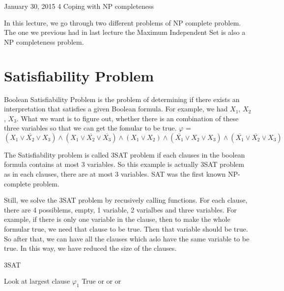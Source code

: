 \documentclass[usletter]{article}
\begin{document}
           {January 30, 2015}                          %
           {4}                                       %
           {Coping with NP completeness}  %

\noindent
In this lecture, we go through two different problems of NP complete problem. The one we previous had in last lecture the Maximum Independent Set is also a NP completeness problem.

\section{Satisfiability Problem}
Boolean Satisfiability Problem is the problem of determining if there exists an interpretation that satisfies a given Boolean formula.  For example,  we had ${X_{1}}$, ${X_{2}}$, ${X_{3}}$. What we want is to figure out, whether there is an combination of these three variables so that we can get the fomular to be true. 
$\varphi$ = $(X_{1}\vee \overline{X_{2}}\vee X_{3}) \wedge (X_{1}\vee \overline{X_{2}}\vee \overline{X_{3}}) \wedge(X_{1}\vee {X_{2}}) \wedge(\overline{X_{1}}\vee X_{2} \vee X_{3}) \wedge (\overline{X_{1}}\vee \overline{X_{2}}\vee X_{3})$

The Satisfiability problem is called 3SAT problem if each clauses in the boolean formula contains at most 3 variables. So this example is actually 3SAT problem as in each clauses, there are at most 3 variables. SAT was the first known NP-complete problem.

Still, we solve the 3SAT problem by recusively calling functions. For each clause, there are 4 possiblems, empty, 1 variable, 2 varialbes and three variables. For example, if there is only one variable in the clause, then to make the whole formular true, we need that clause to be true. Then that variable should be true. So after that, we can have all the clauses which aslo have the same variable to be true. In this way, we have reduced the size of the clauses. 
\begin{algorithm}
\caption{3SAT}
\begin{algorithmic}[1]
\State Look at largest clause $\varphi_{1}$
	\Return True
\EndIf
{}
	\Return {}
\EndIf
{}
	\Return {} or 
\EndIf
{}
	\Return {} or  or 
\EndIf
\EndProcedure
\end{algorithmic}
\end{algorithm}
\end{document}
